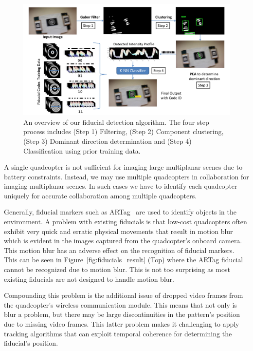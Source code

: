 \begin{figure}[h!]
\centering
\includegraphics[width=0.98\linewidth]{figures/fiducial/overall_flow}
\caption[Overall Workflow of blur resilient fiducial detection algorithm]{An
overview of our fiducial detection algorithm.
    The four step process includes (Step 1) Filtering,
    (Step 2) Component clustering, (Step 3) Dominant direction determination
    and (Step 4) Classification using prior training data.}
 \label{fig:fiducial_workflow}
\end{figure}

A single quadcopter is not sufficient for imaging large multiplanar scenes due
to battery constraints. Instead, we may use multiple quadcopters in
collaboration for imaging multiplanar scenes. In such cases we have to identify
each quadcopter uniquely for accurate collaboration among multiple quadcopters. 

Generally, fiducial markers such as ARTag~\cite{Fiala05} are used to identify
objects in the environment. A problem with existing fiducials is that low-cost
quadcopters often exhibit very quick and erratic physical movements that result
in motion blur which is evident in the images captured from the quadcopter's
onboard camera. This motion blur has an adverse effect on the recognition of fiducial
markers. This can be seen in Figure~\ref{fig:fiducials_result} (Top) where the
ARTag fiducial cannot be recognized due to motion blur. This is not too
surprising as most existing fiducials are not designed to handle motion blur.

Compounding this problem is the additional issue of dropped video
frames from the quadcopter's wireless communication module. This means
that not only is blur a problem, but there may be large
discontinuities in the pattern's position due to missing video
frames. This latter problem makes it challenging to apply tracking algorithms
that can exploit temporal coherence for determining the fiducial's position.

